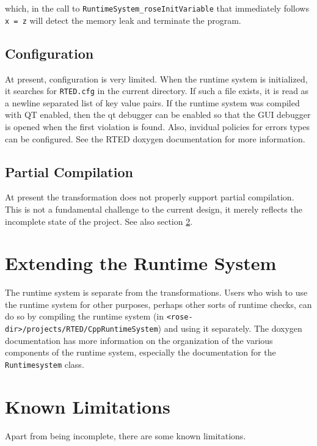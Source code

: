 which, in the call to \texttt{RuntimeSystem\_roseInitVariable} that immediately
follows \texttt{x = z} will detect the memory leak and terminate the program.

\subsection{Configuration}

At present, configuration is very limited.  When the runtime system is
initialized, it searches for \texttt{RTED.cfg} in the current directory.  If
such a file exists, it is read as a newline separated list of key value pairs.
If the runtime system was compiled with QT enabled, then the qt debugger can be
enabled so that the GUI debugger is opened when the first violation is found.
Also, invidual policies for errors types can be configured.  See the RTED doxygen
documentation for more information.


\subsection{Partial Compilation}

At present the transformation does not properly support partial compilation.
This is not a fundamental challenge to the current design, it merely reflects
the incomplete state of the project.  See also section
\ref{RTED:known-limitations}.


\section{Extending the Runtime System}%

The runtime system is separate from the transformations.  Users who wish to use
the runtime system for other purposes, perhaps other sorts of runtime checks,
can do so by compiling the runtime system (in
\texttt{<rose-dir>/projects/RTED/CppRuntimeSystem}) and using it separately.
The doxygen documentation has more information on the organization of the
various components of the runtime system, especially the documentation for the
\texttt{Runtimesystem} class.



\section{Known Limitations}%

\label{RTED:known-limitations}


Apart from being incomplete, there are some known limitations.

